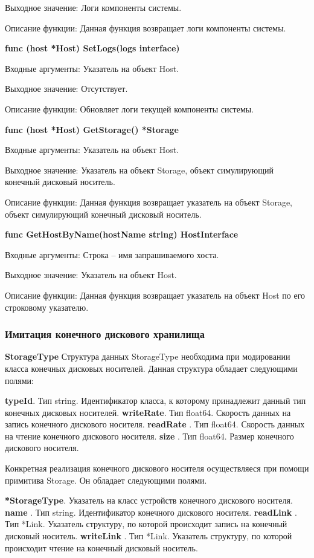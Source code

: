 Выходное значение: Логи компоненты системы. 

Описание функции: Данная функция возвращает логи компоненты системы. 


\textbf{func (host *Host) SetLogs(logs interface)}

Входные аргументы: Указатель на объект Host.

Выходное значение: Отсутствует.

Описание функции: Обновляет логи текущей компоненты системы. 


\textbf{func (host *Host) GetStorage() *Storage }

Входные аргументы: Указатель на объект Host.

Выходное значение: Указатель на объект Storage, объект симулирующий конечный дисковый носитель.

Описание функции: Данная функция возвращает указатель на объект Storage, объект симулирующий конечный дисковый носитель.


\textbf{func GetHostByName(hostName string) HostInterface }

Входные аргументы: Строка -- имя запрашиваемого хоста. 

Выходное значение: Указатель на объект Host.

Описание функции: Данная функция возвращает указатель на объект Host по его строковому указателю.

\subsubsection{Имитация конечного дискового хранилища}
\textbf{StorageType}
Структура данных StorageType необходима при модировании класса конечных дисковых носителей. Данная структура обладает следующими полями:

\textbf{	typeId}. Тип    string. Идентификатор класса, к которому принадлежит данный тип конечных дисковых носителей. 
\textbf{	writeRate}. Тип float64. Скорость данных на запись конечного дискового носителя.
\textbf{	readRate }. Тип float64. Скорость данных на чтение конечного дискового носителя.
\textbf{	size     }. Тип float64. Размер конечного дискового носителя.

Конкретная реализация конечного дискового носителя осуществляеся при помощи примитива Storage. Он обладает следующими полями. 

\textbf{	*StorageType}. Указатель на класс устройств конечного дискового носителя. 
\textbf{	name     }. Тип string. Идентификатор конечного дискового носителя.
\textbf{	readLink }. Тип *Link. Указатель структуру, по которой происходит запись на  конечный дисковый носитель.
\textbf{	writeLink }. Тип *Link. Указатель структуру, по которой происходит чтение на  конечный дисковый носитель.

